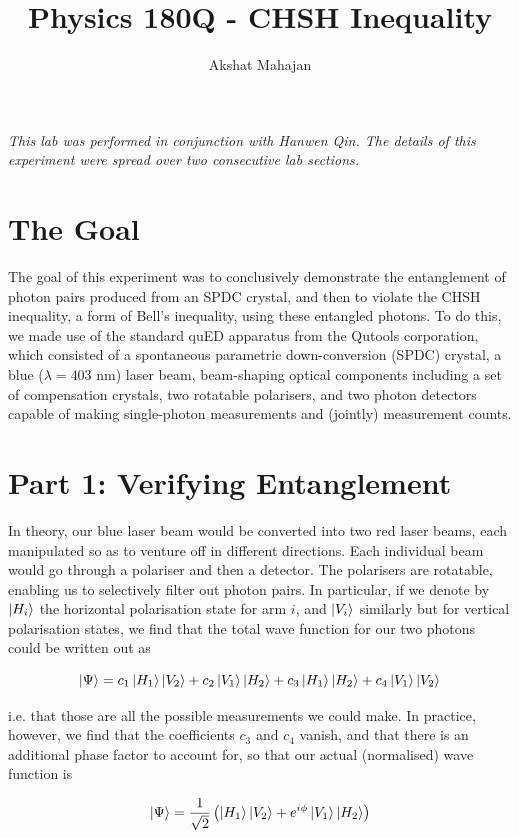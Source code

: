 \documentclass[10pt,a4paper]{article}
\author{Akshat Mahajan}
\title{Physics 180Q - CHSH Inequality}
\begin{document}
\maketitle
\noindent \textsl{This lab was performed in conjunction with Hanwen Qin. The details of this experiment were spread over two consecutive lab sections.}
\section*{The Goal}
The goal of this experiment was to conclusively demonstrate the entanglement of photon pairs produced from an SPDC crystal, and then to violate the CHSH inequality, a form of Bell's inequality, using these entangled photons. To do this, we made use of the standard quED apparatus from the Qutools corporation, which consisted of a spontaneous parametric down-conversion (SPDC) crystal, a blue ($\lambda = 403$ nm) laser beam, beam-shaping optical components including a set of compensation crystals, two rotatable polarisers, and two photon detectors capable of making single-photon measurements and (jointly) measurement counts.
\section*{Part 1: Verifying Entanglement}
In theory, our blue laser beam would be converted into two red laser beams, each manipulated so as to venture off in different directions. Each individual beam would go through a polariser and then a detector. The polarisers are rotatable, enabling us to selectively filter out photon pairs. In particular, if we denote by $\ket{H_{i}}$ the horizontal polarisation state for arm $i$, and $\ket{V_{i}}$ similarly but for vertical polarisation states, we find that the total wave function for our two photons could be written out as

$$\ket{\Psi} = c_{1}\ket{H_{1}}\ket{V_{2}} + c_{2}\ket{V_{1}}\ket{H_{2}} + c_{3}\ket{H_{1}}\ket{H_{2}} + c_{4}\ket{V_{1}}\ket{V_{2}}$$

\noindent i.e. that those are all the possible measurements we could make. In practice, however, we find that the coefficients $c_{3}$ and $c_{4}$ vanish, and that there is an additional phase factor to account for, so that our actual (normalised) wave function is 

$$\ket{\Psi} = \dfrac{1}{\sqrt{2}}\left(\ket{H_{1}}\ket{V_{2}} + e^{i\phi}\ket{V_{1}}\ket{H_{2}}\right)$$
\end{document}
